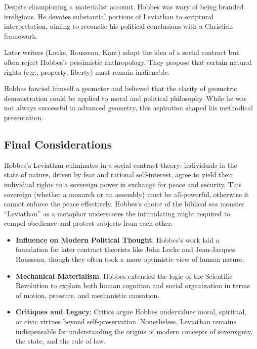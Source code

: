     \begin{remark}
        Despite championing a materialist account, Hobbes was wary of being branded irreligious. He devotes substantial portions of Leviathan to scriptural interpretation, aiming to reconcile his political conclusions with a Christian framework.
    \end{remark}

    \begin{remark}
        Later writers (Locke, Rousseau, Kant) adopt the idea of a social contract but often reject Hobbes’s pessimistic anthropology. They propose that certain natural rights (e.g., property, liberty) must remain inalienable.
    \end{remark}

    \begin{remark}
        Hobbes fancied himself a geometer and believed that the clarity of geometric demonstration could be applied to moral and political philosophy. While he was not always successful in advanced geometry, this aspiration shaped his methodical presentation.
    \end{remark}

    \subsection*{Final Considerations}

        Hobbes’s Leviathan culminates in a social contract theory: individuals in the state of nature, driven by fear and rational self-interest, agree to yield their individual rights to a sovereign power in exchange for peace and security. This sovereign (whether a monarch or an assembly) must be all-powerful, otherwise it cannot enforce the peace effectively. Hobbes’s choice of the biblical sea monster “Leviathan” as a metaphor underscores the intimidating might required to compel obedience and protect subjects from each other.

        \begin{itemize}
            \item \textbf{Influence on Modern Political Thought}: Hobbes’s work laid a foundation for later contract theorists like John Locke and Jean-Jacques Rousseau, though they often took a more optimistic view of human nature.
            \item \textbf{Mechanical Materialism}: Hobbes extended the logic of the Scientific Revolution to explain both human cognition and social organization in terms of motion, pressure, and mechanistic causation.
            \item \textbf{Critiques and Legacy}: Critics argue Hobbes undervalues moral, spiritual, or civic virtues beyond self-preservation. Nonetheless, Leviathan remains indispensable for understanding the origins of modern concepts of sovereignty, the state, and the rule of law.
        \end{itemize}






